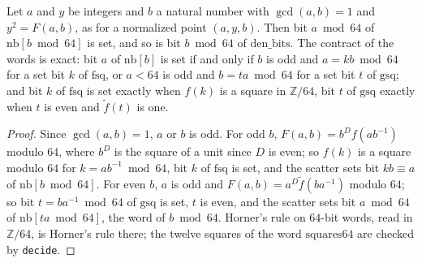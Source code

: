 \begin{lemma}\label{lem:twoAdic_point}
  \leanok
  Let $a$ and $y$ be integers and $b$ a natural number with $\gcd(a, b) = 1$ and $y^2 = F(a, b)$, as
  for a normalized point $(a, y, b)$. Then bit $a \bmod 64$ of $\mathrm{nb}[b \bmod 64]$ is set, and
  so is bit $b \bmod 64$ of $\mathrm{den\_bits}$. The contract of the words is exact: bit $a$ of
  $\mathrm{nb}[b]$ is set if and only if $b$ is odd and $a = k b \bmod 64$ for a set bit $k$ of
  $\mathrm{fsq}$, or $a < 64$ is odd and $b = t a \bmod 64$ for a set bit $t$ of $\mathrm{gsq}$; and
  bit $k$ of $\mathrm{fsq}$ is set exactly when $f(k)$ is a square in $\mathbb{Z}/64$, bit $t$ of
  $\mathrm{gsq}$ exactly when $t$ is even and $\tilde f(t)$ is one.
\end{lemma}

\begin{proof}
  \leanok
  Since $\gcd(a, b) = 1$, $a$ or $b$ is odd. For odd $b$, $F(a, b) = b^D f(a b^{-1})$ modulo $64$,
  where $b^D$ is the square of a unit since $D$ is even; so $f(k)$ is a square modulo $64$ for $k =
  a b^{-1} \bmod 64$, bit $k$ of $\mathrm{fsq}$ is set, and the scatter sets bit $k b \equiv a$ of
  $\mathrm{nb}[b \bmod 64]$. For even $b$, $a$ is odd and $F(a, b) = a^D \tilde f(b a^{-1})$ modulo
  $64$; so bit $t = b a^{-1} \bmod 64$ of $\mathrm{gsq}$ is set, $t$ is even, and the scatter sets
  bit $a \bmod 64$ of $\mathrm{nb}[t a \bmod 64]$, the word of $b \bmod 64$. Horner's rule on
  $64$-bit words, read in $\mathbb{Z}/64$, is Horner's rule there; the twelve squares of the word
  $\mathrm{squares64}$ are checked by \verb|decide|.
\end{proof}

